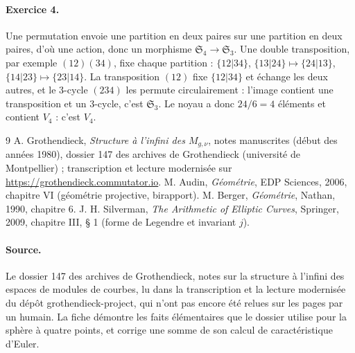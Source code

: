 \documentclass[11pt,a4paper]{article}
\theoremstyle{plain}
\theoremstyle{definition}
\theoremstyle{remark}
\newcommand{\Sym}{\mathfrak{S}}
\begin{document}
\paragraph{Exercice 4.} Une permutation envoie une partition en deux paires sur une partition en deux paires, d'où une action, donc un morphisme $\Sym_4\to\Sym_3$. Une double transposition, par exemple $(12)(34)$, fixe chaque partition : $\{12|34\}$, $\{13|24\}\mapsto\{24|13\}$, $\{14|23\}\mapsto\{23|14\}$. La transposition $(12)$ fixe $\{12|34\}$ et échange les deux autres, et le $3$-cycle $(234)$ les permute circulairement : l'image contient une transposition et un $3$-cycle, c'est $\Sym_3$. Le noyau a donc $24/6=4$ éléments et contient $V_4$ : c'est $V_4$.

\begin{thebibliography}{9}
 A. Grothendieck, \emph{Structure à l'infini des $M_{g,\nu}$}, notes manuscrites (début des années 1980), dossier 147 des archives de Grothendieck (université de Montpellier) ; transcription et lecture modernisée sur \url{https://grothendieck.commutator.io}.
 M. Audin, \emph{Géométrie}, EDP Sciences, 2006, chapitre VI (géométrie projective, birapport).
 M. Berger, \emph{Géométrie}, Nathan, 1990, chapitre 6.
 J. H. Silverman, \emph{The Arithmetic of Elliptic Curves}, Springer, 2009, chapitre III, § 1 (forme de Legendre et invariant $j$).
\end{thebibliography}

\paragraph{Source.} Le dossier 147 des archives de Grothendieck, notes sur la structure à l'infini des espaces de modules de courbes, lu dans la transcription et la lecture modernisée du dépôt grothendieck-project, qui n'ont pas encore été relues sur les pages par un humain. La fiche démontre les faits élémentaires que le dossier utilise pour la sphère à quatre points, et corrige une somme de son calcul de caractéristique d'Euler.
\end{document}
